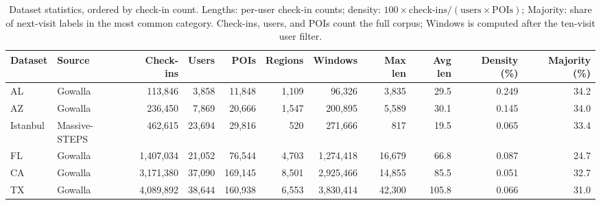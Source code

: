 \begin{table}[!t]
\caption{Dataset statistics, ordered by check-in count. Lengths: per-user check-in counts; density: $100\times\text{check-ins}/(\text{users}\times\text{POIs})$; Majority: share of next-visit
labels in the most common category. Check-ins, users, and POIs count the
full corpus; Windows is computed after the ten-visit user filter.}
\label{tab:datasets}
\centering
\begin{tabular}{l l r r r r r r r r r}
\hline
\textbf{Dataset} & \textbf{Source} & \textbf{Check-ins} & \textbf{Users} & \textbf{POIs} &
\textbf{Regions} & \textbf{Windows} & \textbf{Max len} & \textbf{Avg len} & \textbf{Density (\%)} & \textbf{Majority (\%)} \\
\hline
AL       & Gowalla       &   113{,}846 &  3{,}858 &  11{,}848 & 1{,}109 &    96{,}326 & 3{,}835 &  29.5 & 0.249 & 34.2 \\
AZ       & Gowalla       &   236{,}450 &  7{,}869 &  20{,}666 & 1{,}547 &   200{,}895 & 5{,}589 &  30.1 & 0.145 & 34.0 \\
Istanbul & Massive-STEPS &   462{,}615 & 23{,}694 &  29{,}816 &     520 &   271{,}666 &     817 &  19.5 & 0.065 & 33.4 \\
FL       & Gowalla       & 1{,}407{,}034 & 21{,}052 &  76{,}544 & 4{,}703 & 1{,}274{,}418 & 16{,}679 &  66.8 & 0.087 & 24.7 \\
CA       & Gowalla       & 3{,}171{,}380 & 37{,}090 & 169{,}145 & 8{,}501 & 2{,}925{,}466 & 14{,}855 &  85.5 & 0.051 & 32.7 \\
TX       & Gowalla       & 4{,}089{,}892 & 38{,}644 & 160{,}938 & 6{,}553 & 3{,}830{,}414 & 42{,}300 & 105.8 & 0.066 & 31.0 \\
\hline
\end{tabular}
\end{table}
